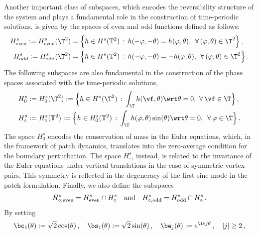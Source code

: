 \documentclass[a4paper,reqno,10pt]{article}
\begin{document}
Another important class of subspaces, which encodes the reversibility structure of the system and plays a fundamental role in the construction of time-periodic solutions, is given by the spaces of even and odd functions defined as follows:
\begin{align}
	 H^s_{\textnormal{even}}:=  H^s_{\textnormal{even}}(\T^2)& =\Big\{h\in H^{s}(\mathbb{T}^{2}) \, : \,  h(-\varphi,-\theta)=h(\varphi,\theta),\;\, \forall \, (\varphi,\theta)\in\T^{2}\Big\} \,,  \label{FS-even}\\
	H^s_{\textnormal{odd}} :=  H^s_{\textnormal{odd}}(\T^2) & =\Big\{h\in H^{s}(\mathbb{T}^{2})  \, : \,  h(-\varphi,-\theta)=-h(\varphi,\theta), \;\, \forall \,(\varphi,\theta)\in\T^{2}\Big\} \,.\label{FS-odd}
\end{align}
The following subspaces are also fundamental in the construction of the phase spaces associated with the time-periodic solutions,
\begin{align}
    H_0^s & := H_0^s(\T^2) := \Big\{ h\in H^s(\T^2)  \, : \,\int_{\T}h(\vf,\theta) \wrt\theta = 0,\, \, \forall\,\vf\in\T \Big\}\,, \\
    H_\circ^{s}&:=H_{\circ}^{s}(\mathbb{T}^{2}):=\Big\{ h\in H^{s}_0(\mathbb{T}^{2})  \, : \, \int_{\T}h(\varphi,\theta)\sin(\theta)\wrt\theta=0,\, \ \forall\,\varphi\in\T \Big\}\,. \label{Hcirc.def}
\end{align}
The space $H_0^s$  encodes the conservation of mass in the Euler equations, which, in the framework of patch dynamics, translates into the zero-average condition for the boundary perturbation. 
The space $H_\circ^s$, instead, is related to the invariance of the Euler equations under vertical translations in the case of symmetric vortex pairs. This symmetry is reflected in the degeneracy of the first sine mode in the patch formulation.
Finally, we also define the subspaces
\begin{align}\label{Hs-circ}
H^{s}_{\circ,\textnormal{even}}=H^{s}_{\textnormal{even}}\cap H^s_{\circ}\quad\hbox{and}\quad H^{s}_{\circ,\textnormal{odd}}=H^{s}_{\textnormal{odd}}\cap H^s_{\circ} \,.
\end{align}
By setting
\begin{align}\label{basis-1}
\bc_{1}(\theta):= \sqrt{2}\cos(\theta)\,,\quad \bs_{1}(\theta):=\sqrt{2}\sin(\theta)\,,\quad \be_{j}(\theta) := e^{\im j\theta}\,, \quad |j|\geq 2\,,
\end{align}
\end{document}
